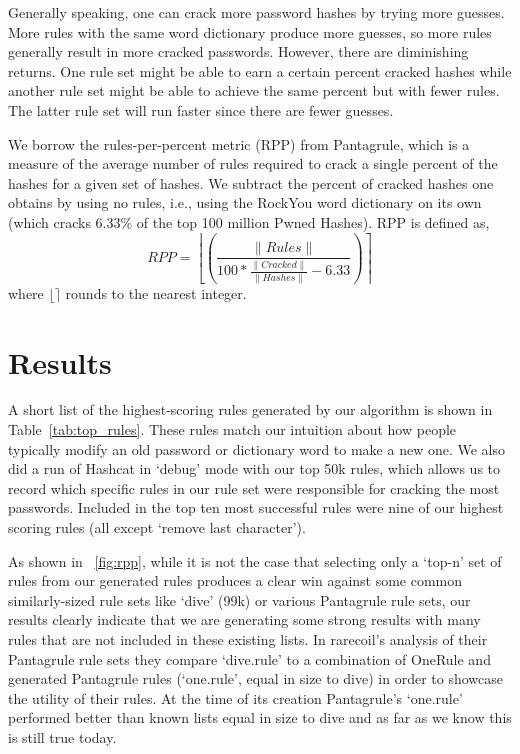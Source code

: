 \documentclass[letterpaper,twocolumn,10pt]{article}
\begin{document}
Generally speaking, one can crack more password hashes by trying more guesses.
More rules with the same word dictionary produce more guesses, so more rules
generally result in more cracked passwords. However, there are diminishing
returns. One rule set might be able to earn a certain percent cracked hashes
while another rule set might be able to achieve the same percent but with fewer
rules. The latter rule set will run faster since there are fewer guesses.

We borrow the rules-per-percent metric (RPP) from Pantagrule\cite{pantagrule},
which is a measure of the average number of rules required to crack a single
percent of the hashes for a given set of hashes. We subtract the percent of
cracked hashes one obtains by using no rules, i.e., using the RockYou
word dictionary on its own (which cracks 6.33\% of the top 100 million Pwned
Hashes). RPP is defined as,
\begin{equation*}
RPP =\left\lfloor\left(\frac{\|Rules\|}{100*\frac{\|Cracked\|}{\|Hashes\|} -
6.33}\right)\right\rceil
\end{equation*}
where $\lfloor\rceil$ rounds to the nearest integer.

\section{Results}
\label{sec:results}

A short list of the highest-scoring rules generated by our algorithm is shown
in Table~\ref{tab:top_rules}. These rules match our intuition about how people
typically modify an old password or dictionary word to make a new one. We also
did a run of Hashcat in `debug' mode with our top 50k rules, which allows us to
record which specific rules in our rule set were responsible for cracking the most
passwords. Included in the top ten most successful rules were nine of our
highest scoring rules (all except `remove last character').

As shown in ~\ref{fig:rpp}, while it is not the case that selecting only a
`top-n' set of rules from our
generated rules produces a clear win against some common similarly-sized
rule sets like `dive' (99k) or various Pantagrule rule sets, our results
clearly indicate that we are generating some strong results with many rules
that are not included in these existing lists. In rarecoil's analysis of their Pantagrule rule sets
they compare `dive.rule' to a combination of OneRule and generated Pantagrule
rules (`one.rule', equal in size to dive) in order to showcase the utility of their
rules. At the time of its creation Pantagrule's `one.rule' performed better than
known lists equal in size to dive and as far as we know this is still true today.
\end{document}
